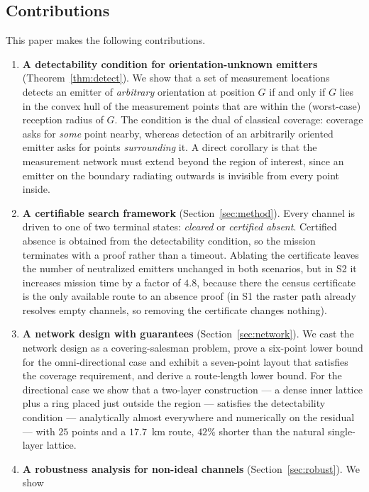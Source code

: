 \documentclass[preprint,12pt,3p]{elsarticle}
\theoremstyle{definition}
\begin{document}
\subsection{Contributions}

This paper makes the following contributions.

\begin{enumerate}
\item \textbf{A detectability condition for orientation-unknown emitters}
(Theorem~\ref{thm:detect}). We show that a set of measurement locations detects an emitter of
\emph{arbitrary} orientation at position $G$ if and only if $G$ lies in the convex hull of the
measurement points that are within the (worst-case) reception radius of $G$. The condition is
the dual of classical coverage: coverage asks for \emph{some} point nearby, whereas detection of
an arbitrarily oriented emitter asks for points \emph{surrounding} it. A direct corollary is that
the measurement network must extend beyond the region of interest, since an emitter on the
boundary radiating outwards is invisible from every point inside.
\item \textbf{A certifiable search framework} (Section~\ref{sec:method}). Every channel is driven
to one of two terminal states: \emph{cleared} or \emph{certified absent}. Certified absence is
obtained from the detectability condition, so the mission terminates with a proof rather than a
timeout. Ablating the certificate leaves the number of neutralized emitters unchanged in both
scenarios, but in S2 it increases mission time by a factor of $4.8$, because there the census
certificate is the only available route to an absence proof (in S1 the raster path already resolves
empty channels, so removing the certificate changes nothing).
\item \textbf{A network design with guarantees} (Section~\ref{sec:network}). We cast the network
design as a covering-salesman problem, prove a six-point lower bound for the omni-directional case
and exhibit a seven-point layout that satisfies the coverage requirement, and derive a route-length
lower bound. For the directional case we show that a two-layer construction --- a dense inner
lattice plus a ring placed just outside the region --- satisfies the detectability condition --- analytically almost everywhere and numerically on the residual --- with $25$ points and a $17.7$~km route, $42\%$ shorter than the natural single-layer lattice.
\item \textbf{A robustness analysis for non-ideal channels} (Section~\ref{sec:robust}). We show

\end{enumerate}
\end{document}
